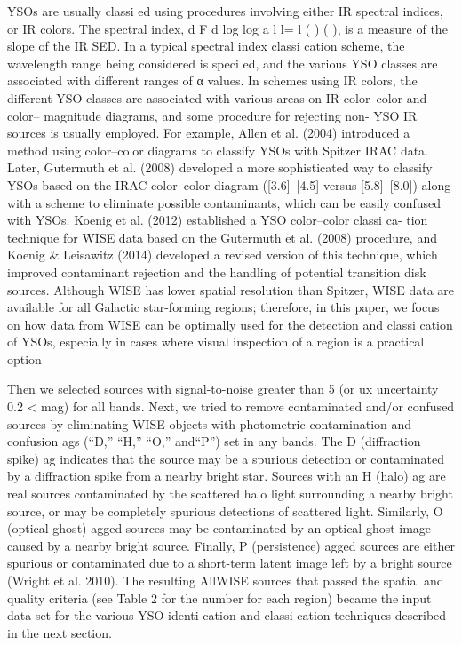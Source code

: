 \documentclass[../main.tex]{subfiles}
\begin{document}
{YSOs are usually classi ed using procedures involving
either IR spectral indices, or IR colors. The spectral index,
d F d log log a l l= l ( ) ( ), is a measure of the slope of the IR
SED. In a typical spectral index classi cation scheme, the
wavelength range being considered is speci ed, and the various
YSO classes are associated with different ranges of α values. In
schemes using IR colors, the different YSO classes are
associated with various areas on IR color–color and color–
magnitude diagrams, and some procedure for rejecting non-
YSO IR sources is usually employed. For example, Allen et al.
(2004) introduced a method using color–color diagrams to
classify YSOs with Spitzer IRAC data. Later, Gutermuth et al.
(2008) developed a more sophisticated way to classify YSOs
based on the IRAC color–color diagram ([3.6]–[4.5] versus
	[5.8]–[8.0]) along with a scheme to eliminate possible
contaminants, which can be easily confused with YSOs.
Koenig et al. (2012) established a YSO color–color classi ca-
tion technique for WISE data based on the Gutermuth et al.
(2008) procedure, and Koenig & Leisawitz (2014) developed a
revised version of this technique, which improved contaminant
rejection and the handling of potential transition disk sources.
Although WISE has lower spatial resolution than Spitzer,
WISE data are available for all Galactic star-forming regions;
therefore, in this paper, we focus on how data from WISE can be
optimally used for the detection and classi cation of YSOs,
especially in cases where visual inspection of a region is a
practical option

Then we selected sources with signal-to-noise
greater than 5 (or ux uncertainty 0.2
< mag) for all bands. Next,
we tried to remove contaminated and/or confused sources by
eliminating WISE objects with photometric contamination and
confusion ags (“D,” “H,” “O,” and“P”) set in any bands. The D
(diffraction spike) ag indicates that the source may be a spurious
detection or contaminated by a diffraction spike from a nearby
bright star. Sources with an H (halo) ag are real sources
contaminated by the scattered halo light surrounding a nearby
bright source, or may be completely spurious detections of
scattered light. Similarly, O (optical ghost) agged sources may
be contaminated by an optical ghost image caused by a nearby
bright source. Finally, P (persistence) agged sources are either
spurious or contaminated due to a short-term latent image left by a
bright source (Wright et al. 2010). The resulting AllWISE sources
that passed the spatial and quality criteria (see Table 2 for the
number for each region) became the input data set for the various
YSO identi cation and classi cation techniques described in the
next section.

}
\end{document}
